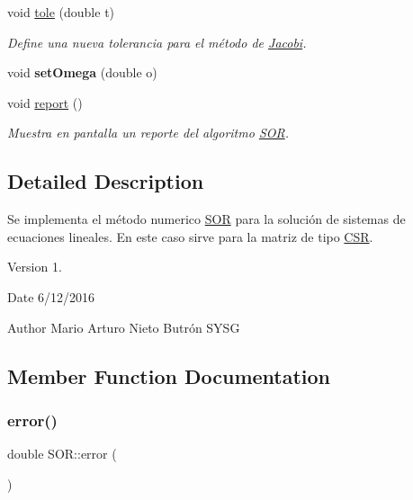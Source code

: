 \begin{DoxyCompactItemize}
void \hyperlink{class_s_o_r_a733204031026cfad302c9d1ced3b7cb5}{tole} (double t)
\begin{DoxyCompactList}\small\item\em Define una nueva tolerancia para el método de \hyperlink{class_jacobi}{Jacobi}. \end{DoxyCompactList}\item 
\hypertarget{class_s_o_r_a6439cc4b7fed3659c435a10e1271cf9f}{}\label{class_s_o_r_a6439cc4b7fed3659c435a10e1271cf9f} 
void {\bfseries set\+Omega} (double o)
\item 
void \hyperlink{class_s_o_r_a8af2a594824ed5a658035d9f1865df26}{report} ()
\begin{DoxyCompactList}\small\item\em Muestra en pantalla un reporte del algoritmo \hyperlink{class_s_o_r}{S\+OR}. \end{DoxyCompactList}\end{DoxyCompactItemize}


\subsection{Detailed Description}
Se implementa el método numerico \hyperlink{class_s_o_r}{S\+OR} para la solución de sistemas de ecuaciones lineales. En este caso sirve para la matriz de tipo \hyperlink{class_c_s_r}{C\+SR}. 

\begin{DoxyVersion}{Version}
1. 
\end{DoxyVersion}
\begin{DoxyDate}{Date}
6/12/2016 
\end{DoxyDate}
\begin{DoxyAuthor}{Author}
Mario Arturo Nieto Butrón  S\+Y\+SG 
\end{DoxyAuthor}


\subsection{Member Function Documentation}
\hypertarget{class_s_o_r_aecaca47519aefd071caaf6c5dc2516a0}{}\label{class_s_o_r_aecaca47519aefd071caaf6c5dc2516a0} 
\subsubsection{\texorpdfstring{error()}{error()}}
{\footnotesize\ttfamily double S\+O\+R\+::error (\begin{DoxyParamCaption}{ }\end{DoxyParamCaption})\hspace{0.3cm}{\ttfamily [inline]}}




